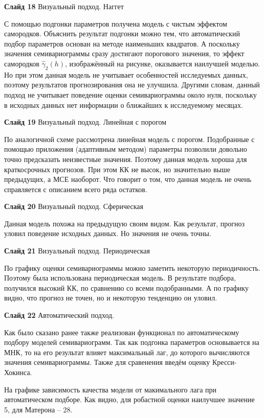 \documentclass[a4paper,10pt]{report}
\begin{document}
\textbf{Слайд 18} Визуальный подход. Наггет

С помощью подгонки параметров получена модель с чистым эффектом самородков. Объяснить результат подгонки можно тем, что автоматический подбор параметров основан на методе наименьших квадратов. А поскольку значения семивариограммы сразу достигают порогового значения, то эффект самородков $ \widehat{\gamma}_2(h) $, изображённый на рисунке, оказывается наилучшей моделью. Но при этом данная модель не учитывает особенностей исследуемых данных, поэтому результатов прогнозирования она не улучшила. Другими словам, данный подход не учитывает поведение оценки семивариограммы около нуля, поскольку в исходных данных нет информации о ближайших к исследуемому месяцах.

\textbf{Слайд 19} Визуальный подход. Линейная с порогом

По аналогичной схеме рассмотрена линейная модель с порогом. Подобранные с помощью приложения (адаптивным методом) параметры позволили довольно точно предсказать неизвестные значения. Поэтому данная модель хороша для краткосрочных прогнозов. При этом КК не высок, но значительно выше предыдущих, а МСЕ наоборот. Что говорит о том, что данная модель не очень справляется с описанием всего ряда остатков.

\textbf{Слайд 20} Визуальный подход. Сферическая

Данная модель похожа на предыдущую своим видом. Как результат, прогноз уловил поведение исходных данных. Но значения не очень точны.

\textbf{Слайд 21} Визуальный подход. Периодическая

По графику оценки семивариограммы можно заметить некоторую периодичность. Поэтому была использована периодическая модель. В результате подбора, получился высокий КК, по сравнению со всеми подобранными. А по графику видно, что прогноз не точен, но и некоторую тенденцию он уловил.

\textbf{Слайд 22} Автоматический подход.

Как было сказано ранее также реализован функционал по автоматическому подбору моделей семивариограмм. Так как подгонка параметров основывается на МНК, то на его результат влияет максимальный лаг, до которого вычисляются значения семивариограммы. Также для сравенения введём оценку Кресси-Хокинса.

На графике зависимость качества модели от макимального лага при автоматическом подборе. Как видно, для робастной оценки наилучшее значение 5, для Матерона -- 28.
\end{document}
